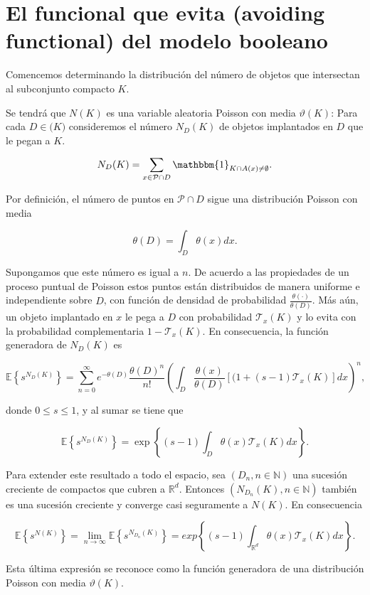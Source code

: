 \section{El funcional que evita (avoiding functional) del modelo booleano}

Comencemos determinando la distribuci\'on del n\'umero de objetos que intersectan al subconjunto compacto $K$.

Se tendr\'a que $N(K)$ es una variable aleatoria Poisson con media $\vartheta(K)$: Para cada $D\in\mathcal(K)$ consideremos el n\'umero $N_D(K)$ de objetos implantados en $D$ que le pegan a $K$.

\[N_D(K)=\sum_{x\in\mathcal{P}\cap D}\mathbbm{1}_{K\cap A(x)\neq\emptyset}.\]

Por definici\'on, el n\'umero de puntos en $\mathcal{P}\cap D$ sigue una distribuci\'on Poisson con media

\[\theta(D)=\int_D \theta(x)dx.\]

Supongamos que este n\'umero es igual a $n$. De acuerdo a las propiedades de un proceso puntual de Poisson estos puntos est\'an distribuidos de manera uniforme e independiente sobre $D$, con funci\'on de densidad de probabilidad $\frac{\theta(\cdot)}{\theta(D)}$. M\'as a\'un, un objeto implantado en $x$ le pega a $D$ con probabilidad $\mathcal{T}_x(K)$ y lo evita con la probabilidad complementaria $1-\mathcal{T}_x(K)$. En consecuencia, la funci\'on generadora de $N_D(K)$ es

\[\mathbb{E}\left\{s^{N_D(K)}\right\}=\sum_{n=0}^\infty e^{-\theta(D)}\frac{\theta(D)^n}{n!}\left(\int_D\frac{\theta(x)}{\theta(D)}[(1+(s-1)\mathcal{T}_x(K)]dx\right)^n,\]

donde $0\leq s\leq 1$, y al sumar se tiene que

\[\mathbb{E}\left\{s^{N_D(K)}\right\}=\exp\left\{(s-1)\int_D\theta(x)\mathcal{T}_x(K)dx\right\}.\]

Para extender este resultado a todo el espacio, sea $(D_n,n\in\mathbb{N})$ una sucesi\'on creciente de compactos que cubren a $\mathbb{R}^d$. Entonces $(N_{D_n}(K),n\in\mathbb{N})$ tambi\'en es una sucesi\'on creciente y converge casi seguramente a $N(K)$. En consecuencia

\[\mathbb{E}\left\{s^{N(K)}\right\}=\lim_{n\rightarrow\infty}\mathbb{E}\left\{s^{N_{D_n}(K)}\right\}=exp\left\{(s-1)\int_{\mathbb{R}^d}\theta(x)\mathcal{T}_x(K)dx\right\}.\]

Esta \'ultima expresi\'on se reconoce como la funci\'on generadora de una distribuci\'on Poisson con media $\vartheta(K)$.

